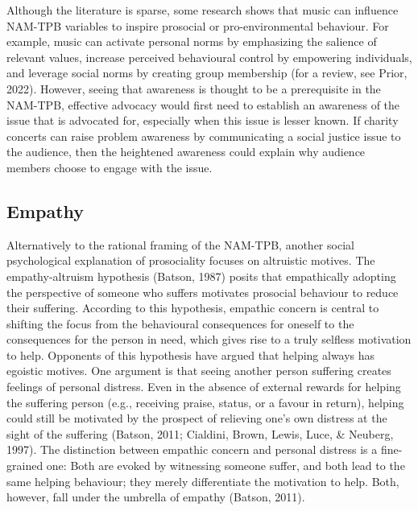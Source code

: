 \documentclass[
  man,floatsintext]{apa6}
\begin{document}
Although the literature is sparse, some research shows that music can influence NAM-TPB variables to inspire prosocial or pro-environmental behaviour. For example, music can activate personal norms by emphasizing the salience of relevant values, increase perceived behavioural control by empowering individuals, and leverage social norms by creating group membership (for a review, see Prior, 2022). However, seeing that awareness is thought to be a prerequisite in the NAM-TPB, effective advocacy would first need to establish an awareness of the issue that is advocated for, especially when this issue is lesser known. If charity concerts can raise problem awareness by communicating a social justice issue to the audience, then the heightened awareness could explain why audience members choose to engage with the issue.

\subsection{Empathy}\label{empathy}

Alternatively to the rational framing of the NAM-TPB, another social psychological explanation of prosociality focuses on altruistic motives. The empathy-altruism hypothesis (Batson, 1987) posits that empathically adopting the perspective of someone who suffers motivates prosocial behaviour to reduce their suffering. According to this hypothesis, empathic concern is central to shifting the focus from the behavioural consequences for oneself to the consequences for the person in need, which gives rise to a truly selfless motivation to help. Opponents of this hypothesis have argued that helping always has egoistic motives. One argument is that seeing another person suffering creates feelings of personal distress. Even in the absence of external rewards for helping the suffering person (e.g., receiving praise, status, or a favour in return), helping could still be motivated by the prospect of relieving one's own distress at the sight of the suffering (Batson, 2011; Cialdini, Brown, Lewis, Luce, \& Neuberg, 1997). The distinction between empathic concern and personal distress is a fine-grained one: Both are evoked by witnessing someone suffer, and both lead to the same helping behaviour; they merely differentiate the motivation to help. Both, however, fall under the umbrella of empathy (Batson, 2011).
\end{document}
